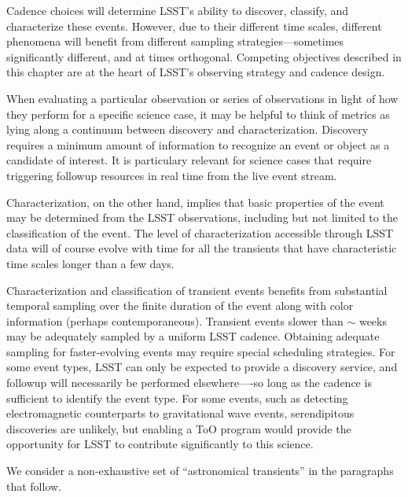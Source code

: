 Cadence choices will determine LSST's ability to discover, classify, and
characterize these events. However, due to their different time scales,
different phenomena will benefit from different sampling
strategies---sometimes
significantly different, and at times orthogonal.  Competing objectives
described in this chapter are at the heart of LSST's observing strategy and
cadence design.

When evaluating a particular observation or series of observations in
light of how they perform for a specific science case, it may be
helpful to think of metrics as lying along a continuum between
discovery and characterization. Discovery requires a minimum amount of
information to recognize an event or object as a candidate of
interest.  It is particulary relevant for science cases that require
triggering followup resources in real time from the live event stream.

Characterization, on the other hand, implies
that basic properties of the event may be determined from the
LSST observations, including but not limited to the classification of
the event. The level of characterization accessible through LSST data
will of course evolve with time for all the transients that have
characteristic time scales longer than a few days.

Characterization and classification of transient events
benefits from substantial temporal sampling over the finite duration of the
event along with color information (perhaps contemporaneous).
Transient events slower than $\sim$ weeks may be adequately sampled by
a uniform LSST cadence.  Obtaining adequate sampling for faster-evolving
events may require special scheduling
strategies.  For some event types, LSST can only be expected to
provide a discovery service, and followup will necessarily be
performed elsewhere----so long as the cadence is sufficient to identify the
event type.
For some events, such as detecting electromagnetic counterparts to
gravitational wave events,
serendipitous discoveries are unlikely, but
enabling a ToO program would provide the opportunity for LSST to
contribute significantly to this science.


We consider a non-exhaustive set of ``astronomical transients'' in the
paragraphs that follow.

